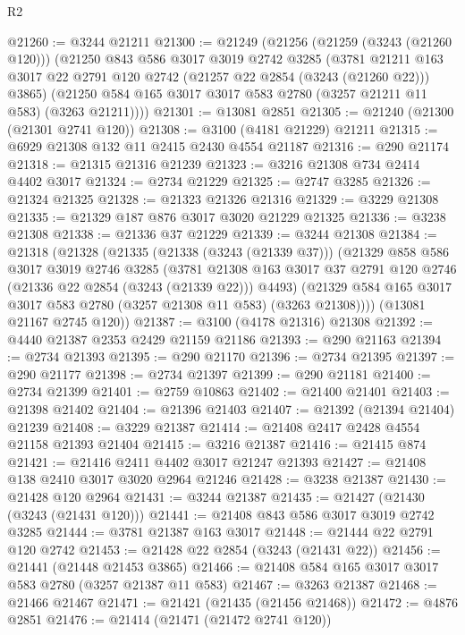 \begin{lexlean}{R2}
\begin{coremodule}
@21260 := @3244 @21211
@21300 := @21249
    (@21256
      (@21259 (@3243 (@21260 @120)))
      (@21250
        @843
        @586
        @3017
        @3019
        @2742
        @3285
        (@3781 @21211 @163 @3017 @22 @2791 @120 @2742 (@21257 @22 @2854 (@3243 (@21260 @22))) @3865)
        (@21250 @584 @165 @3017 @3017 @583 @2780 (@3257 @21211 @11 @583) (@3263 @21211))))
@21301 := @13081 @2851
@21305 := @21240 (@21300 (@21301 @2741 @120))
@21308 := @3100 (@4181 @21229) @21211
@21315 := @6929 @21308 @132 @11 @2415 @2430 @4554 @21187
@21316 := @290 @21174
@21318 := @21315 @21316 @21239
@21323 := @3216 @21308 @734 @2414 @4402 @3017
@21324 := @2734 @21229
@21325 := @2747 @3285
@21326 := @21324 @21325
@21328 := @21323 @21326 @21316
@21329 := @3229 @21308
@21335 := @21329 @187 @876 @3017 @3020 @21229 @21325
@21336 := @3238 @21308
@21338 := @21336 @37 @21229
@21339 := @3244 @21308
@21384 := @21318
    (@21328
      (@21335
        (@21338 (@3243 (@21339 @37)))
        (@21329
          @858
          @586
          @3017
          @3019
          @2746
          @3285
          (@3781
            @21308
            @163
            @3017
            @37
            @2791
            @120
            @2746
            (@21336 @22 @2854 (@3243 (@21339 @22)))
            @4493)
          (@21329 @584 @165 @3017 @3017 @583 @2780 (@3257 @21308 @11 @583) (@3263 @21308))))
      (@13081 @21167 @2745 @120))
@21387 := @3100 (@4178 @21316) @21308
@21392 := @4440 @21387 @2353 @2429 @21159 @21186
@21393 := @290 @21163
@21394 := @2734 @21393
@21395 := @290 @21170
@21396 := @2734 @21395
@21397 := @290 @21177
@21398 := @2734 @21397
@21399 := @290 @21181
@21400 := @2734 @21399
@21401 := @2759 @10863
@21402 := @21400 @21401
@21403 := @21398 @21402
@21404 := @21396 @21403
@21407 := @21392 (@21394 @21404) @21239
@21408 := @3229 @21387
@21414 := @21408 @2417 @2428 @4554 @21158 @21393 @21404
@21415 := @3216 @21387
@21416 := @21415 @874
@21421 := @21416 @2411 @4402 @3017 @21247 @21393
@21427 := @21408 @138 @2410 @3017 @3020 @2964 @21246
@21428 := @3238 @21387
@21430 := @21428 @120 @2964
@21431 := @3244 @21387
@21435 := @21427 (@21430 (@3243 (@21431 @120)))
@21441 := @21408 @843 @586 @3017 @3019 @2742 @3285
@21444 := @3781 @21387 @163 @3017
@21448 := @21444 @22 @2791 @120 @2742
@21453 := @21428 @22 @2854 (@3243 (@21431 @22))
@21456 := @21441 (@21448 @21453 @3865)
@21466 := @21408 @584 @165 @3017 @3017 @583 @2780 (@3257 @21387 @11 @583)
@21467 := @3263 @21387
@21468 := @21466 @21467
@21471 := @21421 (@21435 (@21456 @21468))
@21472 := @4876 @2851
@21476 := @21414 (@21471 (@21472 @2741 @120))

\end{coremodule}
\end{lexlean}
